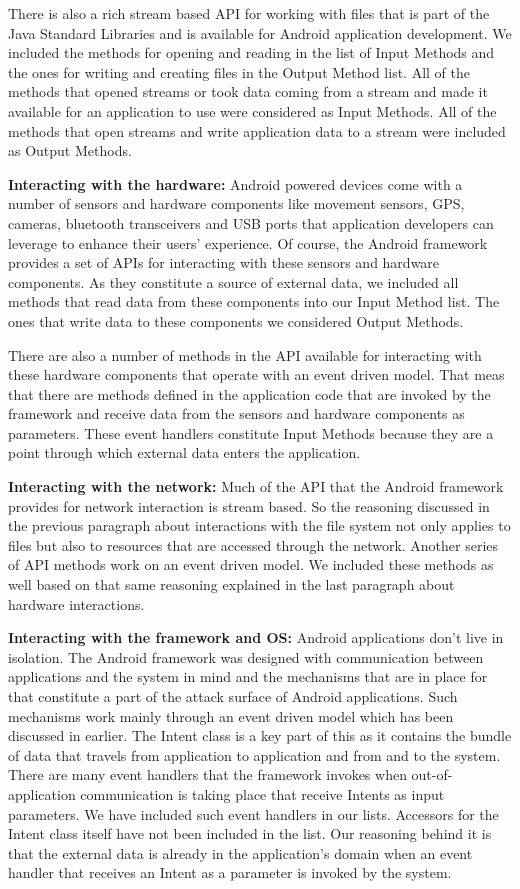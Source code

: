 \documentclass{sig-alternate}
\begin{document}
There is also a rich stream based API for working with files that is part of the Java Standard Libraries and is available for Android application development. We included the methods for opening and reading in the list of Input Methods and the ones for writing and creating files in the Output Method list. All of the methods that opened streams or took data coming from a stream and made it available for an application to use were considered as Input Methods. All of the methods that open streams and write application data to a stream were included as Output Methods.

\textbf{Interacting with the hardware:} Android powered devices come with a number of sensors and hardware components like movement sensors, GPS, cameras, bluetooth transceivers and USB ports that application developers can leverage to enhance their users' experience. Of course, the Android framework provides a set of APIs for interacting with these sensors and hardware components. As they constitute a source of external data, we included all methods that read data from these components into our Input Method list. The ones that write data to these components we considered Output Methods. 

There are also a number of methods in the API available for interacting with these hardware components that operate with an event driven model. That meas that there are methods defined in the application code that are invoked by the framework and receive data from the sensors and hardware components as parameters. These event handlers constitute Input Methods because they are a point through which external data enters the application.

\textbf{Interacting with the network:} Much of the API that the Android framework provides for network interaction is stream based. So the reasoning discussed in the previous paragraph about interactions with the file system not only applies to files but also to resources that are accessed through the network. Another series of API methods work on an event driven model. We included these methods as well based on that same reasoning explained in the last paragraph about hardware interactions.

\textbf{Interacting with the framework and OS:} Android applications don't live in isolation. The Android framework was designed with communication between applications and the system in mind and the mechanisms that are in place for that constitute a part of the attack surface of Android applications. Such mechanisms work mainly through an event driven model which has been discussed in earlier. The Intent class is a key part of this as it contains the bundle of data that travels from application to application and from and to the system. There are many event handlers that the framework invokes when out-of-application communication is taking place that receive Intents as input parameters. We have included such event handlers in our lists. Accessors for the Intent class itself have not been included in the list. Our reasoning behind it is that the external data is already in the application's domain when an event handler that receives an Intent as a parameter is invoked by the system.
\end{document}
